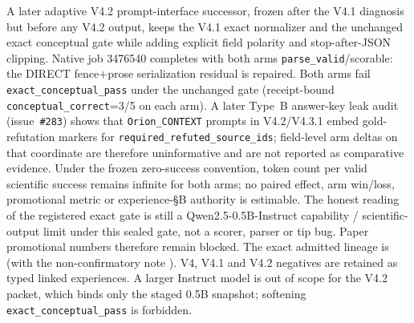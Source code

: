 A later adaptive V4.2 prompt-interface successor, frozen after the V4.1
diagnosis but before any V4.2 output, keeps the V4.1 exact normalizer and the
unchanged exact conceptual gate while adding explicit field polarity and
stop-after-JSON clipping.  Native job 3476540 completes with both arms
\texttt{parse\_valid}/scorable: the DIRECT fence+prose serialization residual
is repaired.  Both arms fail \texttt{exact\_conceptual\_pass} under the
unchanged gate (receipt-bound \texttt{conceptual\_correct}=3/5 on each arm).
A later Type~B answer-key leak audit (issue~\texttt{\#283}) shows that
\texttt{Orion\_CONTEXT} prompts in V4.2/V4.3.1 embed gold-refutation markers for
\texttt{required\_refuted\_source\_ids}; field-level arm deltas on that
coordinate are therefore uninformative and are not reported as comparative
evidence.  Under the frozen zero-success convention, token count per valid
scientific success remains infinite for both arms; no paired effect, arm
win/loss, promotional metric or experience-\S{}B authority is estimable.
The honest reading of the registered exact gate is still a
Qwen2.5-0.5B-Instruct capability / scientific-output limit under this sealed
gate, not a scorer, parser or tip bug.  Paper promotional numbers therefore
remain blocked.  The exact admitted lineage is
(with the non-confirmatory note
).
V4, V4.1 and V4.2 negatives are retained as typed linked experiences.  A larger
Instruct model is out of scope for the V4.2 packet, which binds only the staged
0.5B snapshot; softening \texttt{exact\_conceptual\_pass} is forbidden.

